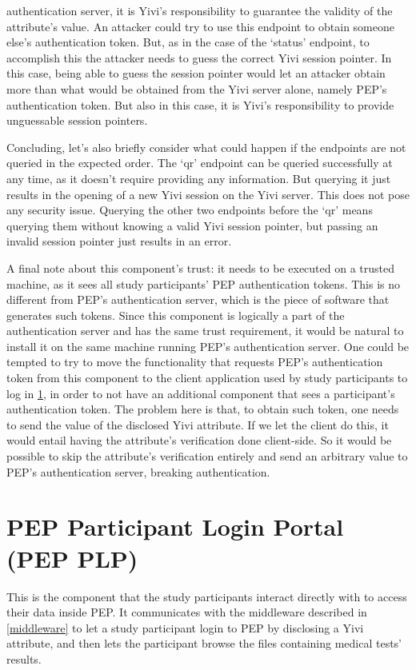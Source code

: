 \documentclass{report}
\begin{document}
authentication server, it is Yivi's responsibility to guarantee the validity of the attribute's value. An attacker could try to use this endpoint to obtain someone else's
authentication token. But, as in the case of the \enquote*{status} endpoint, to accomplish this the attacker needs to guess the correct Yivi session pointer. In this case, being
able to guess the session pointer would let an attacker obtain more than what would be obtained from the Yivi server alone, namely PEP's authentication token. But also in this
case, it is Yivi's responsibility to provide unguessable session pointers. \par
Concluding, let's also briefly consider what could happen if the endpoints are not queried in the expected order. The \enquote*{qr} endpoint can be queried successfully at any
time, as it doesn't require providing any information. But querying it just results in the opening of a new Yivi session on the Yivi server. This does not pose any security
issue. Querying the other two endpoints before the \enquote*{qr} means querying them without knowing a valid Yivi session pointer, but passing an invalid session pointer just
results in an error. \par
A final note about this component's trust: it needs to be executed on a trusted machine, as it sees all study participants' PEP authentication tokens. This is no different from
PEP's authentication server, which is the piece of software that generates such tokens. Since this component is logically a part of the authentication server and has the same trust
requirement, it would be natural to install it on the same machine running PEP's authentication server. One could be tempted to try to move the functionality that requests PEP's
authentication token from this component to the client application used by study participants to log in \ref{pep_plp}, in order to not have an additional component that sees a
participant's authentication token. The problem here is that, to obtain such token, one needs to send the value of the disclosed Yivi attribute. If we let the client do this, it
would entail having the attribute's verification done client-side. So it would be possible to skip the attribute's verification entirely and send an arbitrary value to PEP's
authentication server, breaking authentication.


\section{PEP Participant Login Portal (PEP PLP)}\label{pep_plp}
This is the component that the study participants interact directly with to access their data inside PEP. It communicates with the middleware described in \ref{middleware} to
let a study participant login to PEP by disclosing a Yivi attribute, and then lets the participant browse the files containing medical tests' results. 
\end{document}
